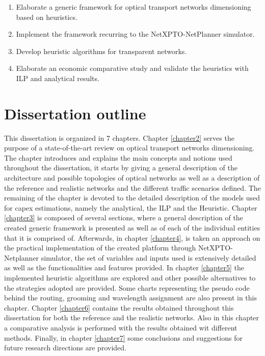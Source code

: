 \begin{enumerate}
  \item Elaborate a generic framework for optical transport networks dimensioning based on heuristics.
  \item Implement the framework recurring to the NetXPTO-NetPlanner simulator.
  \item Develop heuristic algorithms for transparent networks.
  \item Elaborate an economic comparative study and validate the heuristics with ILP and analytical results.
\end{enumerate}


\section{Dissertation outline}
\label{outline}

This dissertation is organized in 7 chapters. Chapter \ref{chapter2} serves the purpose of a state-of-the-art review on optical transport networks dimensioning. The chapter introduces and explains the main concepts and notions used throughout the dissertation, it starts by giving a general description of the architecture and possible topologies of optical networks as well as a description of the reference and realistic networks and the different traffic scenarios defined. The remaining of the chapter is devoted to the detailed description of the models used for \gls{capex} estimations, namely the analytical, the ILP and the Heuristic. Chapter \ref{chapter3} is composed of several sections, where a general description of the created generic framework is presented as well as of each of the individual entities that it is comprised of. Afterwards, in chapter \ref{chapter4}, is taken an approach on the practical implementation of the created platform through NetXPTO-Netplanner simulator, the set of variables and inputs used is extensively detailed as well as the functionalities and features provided. In chapter \ref{chapter5} the implemented heuristic algorithms are explored and other possible alternatives to the strategies adopted are provided. Some charts representing the pseudo code behind the routing, grooming and wavelength assignment are also present in this chapter. Chapter \ref{chapter6} contains the results obtained throughout this dissertation for both the reference and the realistic networks. Also in this chapter a comparative analysis is performed with the results obtained wit different methods.  Finally, in chapter \ref{chapter7} some conclusions and suggestions for future research directions are provided.

